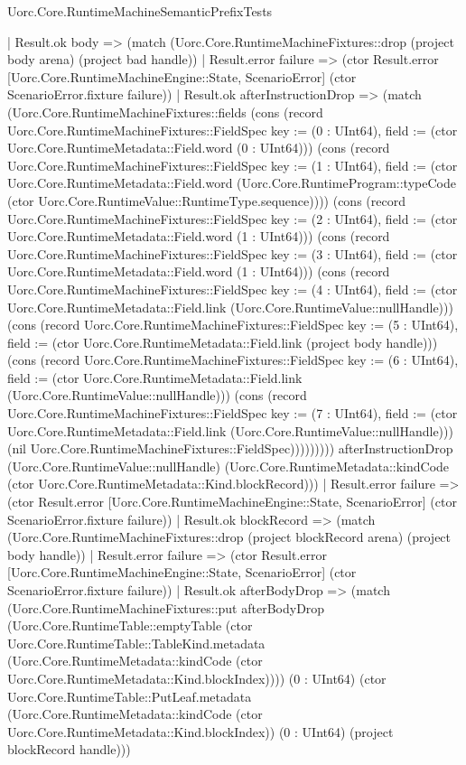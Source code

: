 \begin{lexlean}{Uorc.Core.RuntimeMachineSemanticPrefixTests}
\begin{semanticmodule}
{      | Result.ok body => (match (Uorc.Core.RuntimeMachineFixtures::drop (project body arena) (project bad handle))
        | Result.error failure => (ctor Result.error [Uorc.Core.RuntimeMachineEngine::State, ScenarioError] (ctor ScenarioError.fixture failure))
        | Result.ok afterInstructionDrop => (match (Uorc.Core.RuntimeMachineFixtures::fields (cons (record Uorc.Core.RuntimeMachineFixtures::FieldSpec {key := (0 : UInt64), field := (ctor Uorc.Core.RuntimeMetadata::Field.word (0 : UInt64))}) (cons (record Uorc.Core.RuntimeMachineFixtures::FieldSpec {key := (1 : UInt64), field := (ctor Uorc.Core.RuntimeMetadata::Field.word (Uorc.Core.RuntimeProgram::typeCode (ctor Uorc.Core.RuntimeValue::RuntimeType.sequence)))}) (cons (record Uorc.Core.RuntimeMachineFixtures::FieldSpec {key := (2 : UInt64), field := (ctor Uorc.Core.RuntimeMetadata::Field.word (1 : UInt64))}) (cons (record Uorc.Core.RuntimeMachineFixtures::FieldSpec {key := (3 : UInt64), field := (ctor Uorc.Core.RuntimeMetadata::Field.word (1 : UInt64))}) (cons (record Uorc.Core.RuntimeMachineFixtures::FieldSpec {key := (4 : UInt64), field := (ctor Uorc.Core.RuntimeMetadata::Field.link (Uorc.Core.RuntimeValue::nullHandle))}) (cons (record Uorc.Core.RuntimeMachineFixtures::FieldSpec {key := (5 : UInt64), field := (ctor Uorc.Core.RuntimeMetadata::Field.link (project body handle))}) (cons (record Uorc.Core.RuntimeMachineFixtures::FieldSpec {key := (6 : UInt64), field := (ctor Uorc.Core.RuntimeMetadata::Field.link (Uorc.Core.RuntimeValue::nullHandle))}) (cons (record Uorc.Core.RuntimeMachineFixtures::FieldSpec {key := (7 : UInt64), field := (ctor Uorc.Core.RuntimeMetadata::Field.link (Uorc.Core.RuntimeValue::nullHandle))}) (nil Uorc.Core.RuntimeMachineFixtures::FieldSpec))))))))) afterInstructionDrop (Uorc.Core.RuntimeValue::nullHandle) (Uorc.Core.RuntimeMetadata::kindCode (ctor Uorc.Core.RuntimeMetadata::Kind.blockRecord)))
          | Result.error failure => (ctor Result.error [Uorc.Core.RuntimeMachineEngine::State, ScenarioError] (ctor ScenarioError.fixture failure))
          | Result.ok blockRecord => (match (Uorc.Core.RuntimeMachineFixtures::drop (project blockRecord arena) (project body handle))
            | Result.error failure => (ctor Result.error [Uorc.Core.RuntimeMachineEngine::State, ScenarioError] (ctor ScenarioError.fixture failure))
            | Result.ok afterBodyDrop => (match (Uorc.Core.RuntimeMachineFixtures::put afterBodyDrop (Uorc.Core.RuntimeTable::emptyTable (ctor Uorc.Core.RuntimeTable::TableKind.metadata (Uorc.Core.RuntimeMetadata::kindCode (ctor Uorc.Core.RuntimeMetadata::Kind.blockIndex)))) (0 : UInt64) (ctor Uorc.Core.RuntimeTable::PutLeaf.metadata (Uorc.Core.RuntimeMetadata::kindCode (ctor Uorc.Core.RuntimeMetadata::Kind.blockIndex)) (0 : UInt64) (project blockRecord handle)))
}
\end{semanticmodule}
\end{lexlean}
